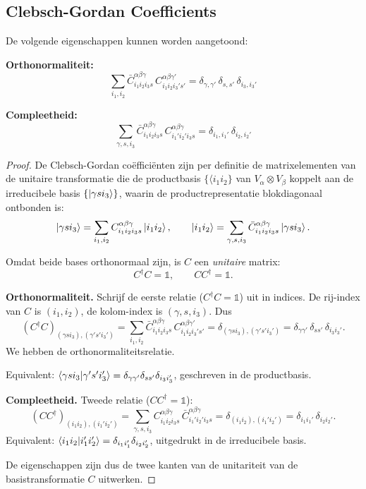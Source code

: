 
\subsection{Clebsch-Gordan Coefficients}

De volgende eigenschappen kunnen worden aangetoond:

\textbf{Orthonormaliteit:}
\[
\sum_{i_1, i_2} \bar{C}_{i_1 i_2 i_3 s}^{\alpha \beta \gamma} \, C_{i_1 i_2 i_3' s'}^{\alpha \beta \gamma'} = \delta_{\gamma, \gamma'} \, \delta_{s, s'} \, \delta_{i_3, i_3'}
\]

\textbf{Compleetheid:}
\[
\sum_{\gamma, s, i_3} \bar{C}_{i_1 i_2 i_3 s}^{\alpha \beta \gamma} \, C_{i_1' i_2' i_3 s}^{\alpha \beta \gamma} = \delta_{i_1, i_1'} \, \delta_{i_2, i_2'}
\]

\begin{proof}
De Clebsch-Gordan coëfficiënten zijn per definitie de matrixelementen van de unitaire transformatie die de productbasis $\{\langle{i_1 i_2}\}$ van $V_\alpha \otimes V_\beta$ koppelt aan de irreducibele basis $\{\ket{\gamma s i_3}\}$, waarin de productrepresentatie blokdiagonaal ontbonden is:
\[
\ket{\gamma s i_3} = \sum_{i_1,i_2} C^{\alpha\beta\gamma}_{i_1 i_2 i_3 s} \ket{i_1 i_2},
\qquad
\ket{i_1 i_2} = \sum_{\gamma,s,i_3} \bar{C}^{\alpha\beta\gamma}_{i_1 i_2 i_3 s} \ket{\gamma s i_3}.
\]

Omdat beide bases orthonormaal zijn, is $C$ een \emph{unitaire} matrix:
\[
C^\dagger C = \mathds{1}, \qquad C C^\dagger = \mathds{1}.
\]

\textbf{Orthonormaliteit.}
Schrijf de eerste relatie ($C^\dagger C = \mathds{1}$) uit in indices. De rij-index van $C$ is $(i_1,i_2)$, de kolom-index is $(\gamma,s,i_3)$. Dus
\[
(C^\dagger C)_{(\gamma s i_3),(\gamma' s' i_3')}
= \sum_{i_1,i_2} \bar{C}^{\alpha\beta\gamma}_{i_1 i_2 i_3 s} \, C^{\alpha\beta\gamma'}_{i_1 i_2 i_3' s'}
= \delta_{(\gamma s i_3),(\gamma' s' i_3')}
= \delta_{\gamma\gamma'}\,\delta_{ss'}\,\delta_{i_3 i_3'}.
\]
We hebben de orthonormaliteitsrelatie. 

Equivalent: $\braket{\gamma s i_3 | \gamma' s' i_3'} = \delta_{\gamma\gamma'}\delta_{ss'}\delta_{i_3i_3'}$, geschreven in de productbasis.

\textbf{Compleetheid.}
Tweede relatie ($CC^\dagger = \mathds{1}$):
\[
(C C^\dagger)_{(i_1 i_2),(i_1' i_2')}
= \sum_{\gamma,s,i_3} C^{\alpha\beta\gamma}_{i_1 i_2 i_3 s} \, \bar{C}^{\alpha\beta\gamma}_{i_1' i_2' i_3 s}
= \delta_{(i_1 i_2),(i_1' i_2')}
= \delta_{i_1 i_1'}\,\delta_{i_2 i_2'}.
\]
Equivalent: $\braket{i_1 i_2 | i_1' i_2'} = \delta_{i_1i_1'}\delta_{i_2i_2'}$, uitgedrukt in de irreducibele basis.

De eigenschappen zijn dus de twee kanten van de unitariteit van de basistransformatie $C$ uitwerken.
\end{proof}



